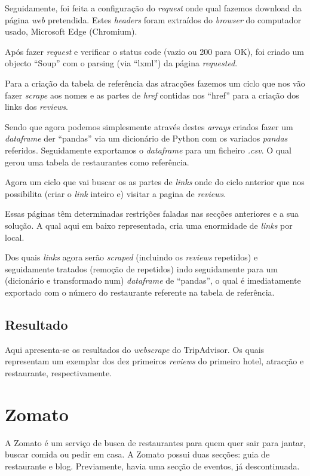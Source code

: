 Seguidamente, foi feita a configuração do \textit{request} onde qual fazemos download da página \textit{web} pretendida. Estes \textit{headers} foram extraídos do \textit{browser} do computador usado, Microsoft Edge (Chromium).

Após fazer \textit{request} e verificar o status code (vazio ou 200 para OK), foi criado um objecto ``Soup'' com o parsing (via ``lxml'') da página \textit{requested}.

Para a criação da tabela de referência das atracções fazemos um ciclo que nos vão fazer \textit{scrape} aos nomes e as partes de \textit{href} contidas nos ``href'' para a criação dos links dos \textit{reviews}.

Sendo que agora podemos simplesmente através destes \textit{arrays} criados fazer um \textit{dataframe} der ``pandas'' via um dicionário de Python com os variados \textit{pandas} referidos. Seguidamente exportamos o \textit{dataframe} para um ficheiro \textit{.csv}. O qual gerou uma tabela de restaurantes como referência.

Agora um ciclo que vai buscar os as partes de \textit{links} onde do ciclo anterior que nos possibilita (criar o \textit{link} inteiro e) visitar a pagina de \textit{reviews}.

Essas páginas têm determinadas restrições faladas nas secções anteriores e a sua solução. A qual aqui em baixo representada, cria uma enormidade de \textit{links} por local.

Dos quais \textit{links} agora serão \textit{scraped} (incluindo os \textit{reviews} repetidos) e seguidamente tratados (remoção de repetidos) indo seguidamente para um (dicionário e transformado num) \textit{dataframe} de ``pandas'', o qual é imediatamente exportado com o número do restaurante referente na tabela de referência.


\subsection{Resultado}
Aqui apresenta-se os resultados do \textit{webscrape} do TripAdvisor. Os quais representam um exemplar dos dez primeiros \textit{reviews} do primeiro hotel, atracção e restaurante, respectivamente.

\section{Zomato}
A Zomato é um serviço de busca de restaurantes para quem quer sair para jantar, buscar comida ou pedir em casa. A Zomato possui duas secções: guia de restaurante e blog. Previamente, havia uma secção de eventos, já descontinuada.

